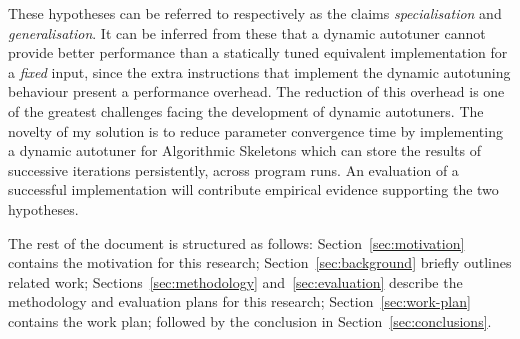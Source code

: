 These hypotheses can be referred to respectively as the claims
\emph{specialisation} and \emph{generalisation}. It can be inferred
from these that a dynamic autotuner cannot provide better performance
than a statically tuned equivalent implementation for a \emph{fixed}
input, since the extra instructions that implement the dynamic
autotuning behaviour present a performance overhead. The reduction of
this overhead is one of the greatest challenges facing the development
of dynamic autotuners. The novelty of my solution is to reduce
parameter convergence time by implementing a dynamic autotuner for
Algorithmic Skeletons which can store the results of successive
iterations persistently, across program runs.
An evaluation of a successful implementation will contribute empirical
evidence supporting the two hypotheses.

The rest of the document is structured as follows:
Section~\ref{sec:motivation} contains the motivation for this
research; Section~\ref{sec:background} briefly outlines related work;
Sections~\ref{sec:methodology} and~\ref{sec:evaluation} describe the
methodology and evaluation plans for this research;
Section~\ref{sec:work-plan} contains the work plan; followed by the
conclusion in Section~\ref{sec:conclusions}.





